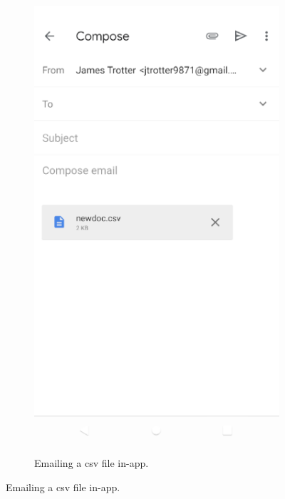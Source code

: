 \documentclass[onecolumn, draftclsnofoot,10pt, compsoc]{IEEEtran}
\begin{document}
\begin{figure}
\begin{subfigure}{.5\textwidth}
    \includegraphics[scale=0.5]{Images/csvexport.png}
    \label{Fig 7.}
    \caption{ Emailing a csv file in-app.}
\end{subfigure}
\end{figure}
\end{document}
